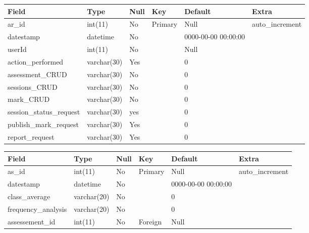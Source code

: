\documentclass[12pt]{article}
\begin{document}
					
					
					\begin{tabular}{|p{1.5in}|p{0.9in}|p{0.5in}|p{1.0in}|p{0.65in}|p{1.1in}|} \hline
					Field & Type & Null & Key & Default & Extra \\ \hline
					ar\_id & int(11) & No & Primary & Null & auto\_increment \\ \hline
					datestamp & datetime & No &  & 0000-00-00 00:00:00 &  \\ \hline
					userId & int(11) & No &  & Null &  \\ \hline
					action\_performed & varchar(30) & Yes &  & 0 &  \\ \hline
					assessment\_CRUD & varchar(30) & No &  & 0 &  \\ \hline
					sessions\_CRUD & varchar(30) & No &  & 0 &  \\ \hline
					mark\_CRUD & varchar(30) & No &  & 0 &  \\ \hline
					session\_status\_request & varchar(30) & yes &  & 0 &  \\ \hline
					publish\_mark\_request & varchar(30) & Yes &  & 0 &  \\ \hline
					report\_request & varchar(30) & Yes &  & 0 &  \\ \hline
					\end{tabular}
					
					
					\begin{tabular}{|p{1.5in}|p{0.9in}|p{0.5in}|p{1.0in}|p{0.65in}|p{1.1in}|} \hline
					Field & Type & Null & Key & Default & Extra \\ \hline
					as\_id & int(11) & No & Primary & Null & auto\_increment \\ \hline
					datestamp & datetime & No &  & 0000-00-00 00:00:00 &  \\ \hline
					class\_average & varchar(20) & No &  & 0 &  \\ \hline
					frequency\_analysis & varchar(20) & No &  & 0 &  \\ \hline
					assessement\_id & int(11) & No & Foreign & Null &  \\ \hline
					\end{tabular}
				\vspace{0.2in}
			
			
	
	
		
		
	\newpage
\end{document}
